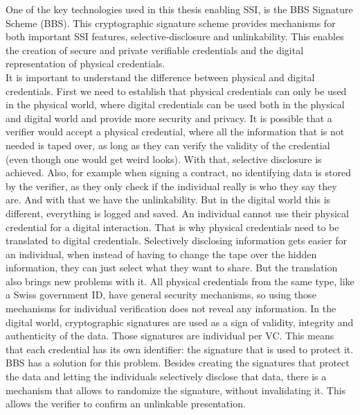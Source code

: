 \documentclass[
	a4paper               %
	,BCOR=0mm            %
	,bibliography=totoc   %
	,listof=totoc         %
	,monolingual
	,twoside=false
]{bfhthesis}              %
\begin{document}
One of the key technologies used in this thesis enabling SSI, is the BBS Signature Scheme (BBS)\cite{bbs-signature-scheme}. This cryptographic signature scheme provides mechanisms for both important SSI features, selective-disclosure and unlinkability. This enables the creation of secure and private verifiable credentials and the digital representation of physical credentials. \\

It is important to understand the difference between physical and digital credentials. First we need to establish that physical credentials can only be used in the physical world, where digital credentials can be used both in the physical and digital world and provide more security and privacy. It is possible that a verifier would accept a physical credential, where all the information that is not needed is taped over, as long as they can verify the validity of the credential (even though one would get weird looks). With that, selective disclosure is achieved. Also, for example when signing a contract, no identifying data is stored by the verifier, as they only check if the individual really is who they say they are. And with that we have the unlinkability. But in the digital world this is different, everything is logged and saved. An individual cannot use their physical credential for a digital interaction. That is why physical credentials need to be translated to digital credentials. Selectively disclosing information gets easier for an individual, when instead of having to change the tape over the hidden information, they can just select what they want to share. But the translation also brings new problems with it. All physical credentials from the same type, like a Swiss government ID, have general security mechanisms, so using those mechanisms for individual verification does not reveal any information. In the digital world, cryptographic signatures are used as a sign of validity, integrity and authenticity of the data. Those signatures are individual per VC. This means that each credential has its own identifier: the signature that is used to protect it. \\

BBS has a solution for this problem. Besides creating the signatures that protect the data and letting the individuals selectively disclose that data, there is a mechanism that allows to randomize the signature, without invalidating it. This allows the verifier to confirm an unlinkable presentation.  \\
\end{document}
